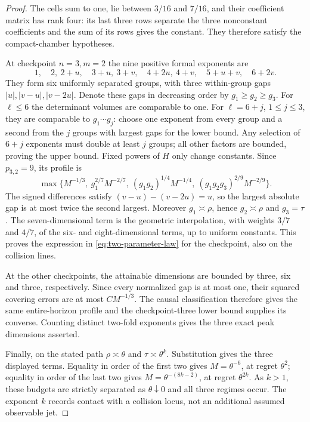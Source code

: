 \documentclass[11pt]{amsart}
\theoremstyle{definition}\newtheorem{definition}[theorem]{Definition}
\theoremstyle{remark}\newtheorem{remark}[theorem]{Remark}
\begin{document}
\begin{proof}
The cells sum to one, lie between $3/16$ and $7/16$, and their coefficient
matrix has rank four: its last three rows separate the three nonconstant
coefficients and the sum of its rows gives the constant. They therefore
satisfy the compact-chamber hypotheses.

At checkpoint $n=3,m=2$ the nine positive formal exponents are
\[
 1,\quad 2,\ 2+u,\quad 3+u,\ 3+v,\quad
 4+2u,\ 4+v,\quad 5+u+v,\quad 6+2v.
\]
They form six uniformly separated groups, with three within-group gaps
$|u|,|v-u|,|v-2u|$. Denote these gaps in decreasing order by
$g_1\ge g_2\ge g_3$. For $\ell\le6$ the determinant volumes
are comparable to one. For $\ell=6+j$, $1\le j\le3$, they are
comparable to $g_1\cdots g_j$: choose one exponent from every group
and a second from the $j$ groups with largest gaps for the lower bound.
Any selection of $6+j$ exponents must double at least $j$ groups;
all other factors are bounded, proving the upper bound. Fixed powers of
$H$ only change constants. Since $p_{3,2}=9$, its profile is
\[
 \max\{M^{-1/3},\ g_1^{2/7}M^{-2/7},\
              (g_1g_2)^{1/4}M^{-1/4},\
              (g_1g_2g_3)^{2/9}M^{-2/9}\}.
\]
The signed differences satisfy $(v-u)-(v-2u)=u$, so the largest
absolute gap is at most twice the second largest. Moreover
$g_1\asymp\rho$, hence $g_2\asymp\rho$ and $g_3=\tau$.
The seven-dimensional term is the geometric interpolation, with weights
$3/7$ and $4/7$, of the six- and eight-dimensional terms, up to uniform
constants. This proves the expression in \eqref{eq:two-parameter-law}
for the checkpoint, also on the collision lines.

At the other checkpoints, the attainable dimensions are bounded by three,
six and three, respectively. Since every normalized gap is at most one,
their squared covering errors are at most $CM^{-1/3}$. The causal
classification therefore gives the same entire-horizon profile and the
checkpoint-three lower bound supplies its converse. Counting distinct
two-fold exponents gives the three exact peak dimensions asserted.

Finally, on the stated path $\rho\asymp\theta$ and
$\tau\asymp\theta^k$. Substitution gives the three displayed terms.
Equality in order of the first two gives $M=\theta^{-6}$, at regret
$\theta^2$; equality in order of the last two gives
$M=\theta^{-(8k-2)}$, at regret $\theta^{2k}$. As $k>1$, these
budgets are strictly separated as $\theta\downarrow0$ and all three
regimes occur. The exponent $k$ records contact with a collision locus,
not an additional assumed observable jet.
\end{proof}
\end{document}
